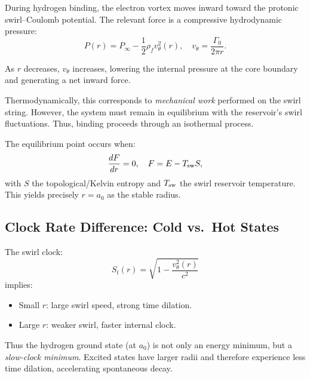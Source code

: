 \documentclass[11pt]{article}
\newcommand{\rhof}{\rho_{\!f}} \newcommand{\rhoF}{\rho_{\!f}}                             %
\begin{document}
            During hydrogen binding, the electron vortex moves inward toward the protonic
            swirl--Coulomb potential. The relevant force is a compressive hydrodynamic
            pressure:
            \begin{equation}
                P(r) = P_\infty - \frac12 \rhof v_\theta^2(r),
                \quad
                v_\theta = \frac{\Gamma_0}{2\pi r}.
            \end{equation}

            As $r$ decreases, $v_\theta$ increases, lowering the internal pressure at the
            core boundary and generating a net inward force.

            Thermodynamically, this corresponds to \emph{mechanical work} performed on the
            swirl string. However, the system must remain in equilibrium with the
            reservoir's swirl fluctuations. Thus, binding proceeds through an isothermal
            process.

            The equilibrium point occurs when:
            \begin{equation}
                \frac{dF}{dr} = 0,
                \quad
                F = E - T_{\rm sw} S,
            \end{equation}
            with $S$ the topological/Kelvin entropy and $T_{\rm sw}$ the swirl reservoir
            temperature. This yields precisely $r = a_0$ as the stable radius.

        \subsection{Clock Rate Difference: Cold vs.\ Hot States}

            The swirl clock:
            \begin{equation}
                S_t(r) = \sqrt{1 - \frac{v_\theta^2(r)}{c^2}}
            \end{equation}
            implies:
            \begin{itemize}
                \item Small $r$: large swirl speed, strong time dilation.
                \item Large $r$: weaker swirl, faster internal clock.
            \end{itemize}

            Thus the hydrogen ground state (at $a_0$) is not only an energy minimum, but a
            \emph{slow-clock minimum}. Excited states have larger radii and therefore
            experience less time dilation, accelerating spontaneous decay.
\end{document}
